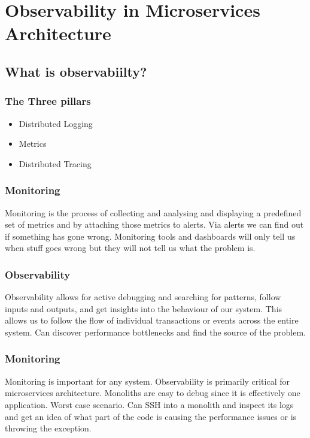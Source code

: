 \section{Observability in Microservices Architecture}

\subsection{What is observabiilty?}

\subsubsection{The Three pillars}

\begin{itemize}
    \item Distributed Logging
    \item Metrics
    \item Distributed Tracing
\end{itemize}

\subsubsection{Monitoring}
Monitoring is the process of collecting and analysing and displaying a predefined set of metrics and by attaching those metrics to alerts.
Via alerts we can find out if something has gone wrong.
Monitoring tools and dashboards will only tell us when stuff goes wrong but they will not tell us what the problem is.

\subsubsection{Observability}
Observability allows for active debugging and searching for patterns, follow inputs and outputs, and get insights into the behaviour of our system.
This allows us to follow the flow of individual transactions or events across the entire system.
Can discover performance bottlenecks and find the source of the problem.

\subsubsection{Monitoring}
Monitoring is important for any system.
Observability is primarily critical for microservices architecture.
Monoliths are easy to debug since it is effectively one application.
Worst case scenario.
Can SSH into a monolith and inspect its logs and get an idea of what part of the code is causing the performance issues or is throwing the exception.

